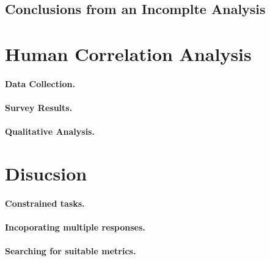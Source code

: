 \documentclass[runningheads]{llncs}
\begin{document}
\subsection{Conclusions from an Incomplte Analysis}

\section{Human Correlation Analysis}
\paragraph{Data Collection.}
\paragraph{Survey Results.}
\paragraph{Qualitative Analysis.}

\section{Disucsion}
\paragraph{Constrained tasks.}
\paragraph{Incoporating multiple responses.}
\paragraph{Searching for suitable metrics.}
\end{document}
